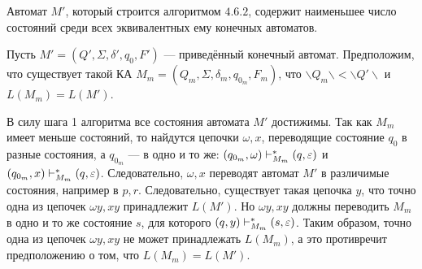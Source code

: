 \begin{mytheorem}
Автомат $M'$, который строится алгоритмом $4.6.2$, содержит наименьшее число состояний среди всех эквивалентных ему конечных автоматов.
\end{mytheorem}
\begin{myproof}
Пусть $M' = (Q',\Sigma, \delta', q_0, F')$ --- приведённый конечный автомат. Предположим, что существует такой КА $M_m = (Q_m,\Sigma, \delta_m, q_{0_m}, F_m)$, что $\backslash Q_m \backslash < \backslash Q' \backslash$ и $L(M_m) = L(M')$.

В силу шага 1 алгоритма все состояния автомата $M'$ достижимы. Так как $M_m$ имеет меньше состояний, то найдутся цепочки $\omega, x$, переводящие состояние $q_0$ в разные состояния, а  $q_{0_m}$ --- в одно и то же: $(q_{0_m}, \omega) \vdash_{M_m}^* (q, \varepsilon)$ и $(q_{0_m}, x) \vdash_{M_m}^* (q, \varepsilon)$. Следовательно, $\omega, x$ переводят автомат $M'$  в различимые состояния, например в $p, r$. Следовательно, существует такая цепочка $y$, что точно одна из цепочек $\omega y, xy$ принадлежит $L(M')$. Но  $\omega y, xy$ должны переводить $M_m$ в одно и то же состояние $s$, для которого $(q, y) \vdash_{M_m}^* (s, \varepsilon)$. Таким образом, точно одна из цепочек $\omega y, xy$ не может принадлежать $L(M_m)$, а это противречит предположению о том, что $L(M_m) = L(M')$.
\end{myproof}


